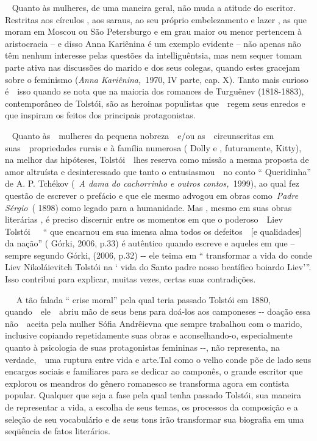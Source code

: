 ~ Quanto às mulheres, de uma maneira geral, não muda a atitude do
escritor. Restritas aos círculos , aos saraus, ao seu próprio
embelezamento e lazer , as que moram em Moscou ou São Petersburgo e em
grau maior ou menor pertencem à aristocracia -- e disso Anna Kariênina é
um exemplo evidente -- não apenas não têm nenhum interesse pelas
questões da intelliguêntsia, mas nem sequer tomam parte ativa nas
discussões do marido e dos seus colegas, quando estes gracejam sobre o
feminismo (\emph{Anna Kariênina,~}1970, IV parte, cap. X). Tanto mais
curioso é~~isso quando se nota que na maioria dos romances de Turguênev
(1818-1883), contemporâneo de Tolstói, são as heroinas populistas
que~~regem seus enredos e que inspiram os feitos dos principais
protagonistas.

~ Quanto às~~mulheres da pequena nobreza~~e/ou as~~circunscritas em
suas~~propriedades rurais e à família numerosa ( Dolly e , futuramente,
Kitty), na melhor das hipóteses, Tolstói~~lhes reserva como missão a
mesma proposta de amor altruísta e desinteressado que tanto o
entusiasmou~~no conto `` Queridinha'' de A. P. Tchékov (~\emph{A dama do
cachorrinho e outros contos,~}1999), ao qual fez questão de escrever o
prefácio e que ele mesmo advogou em obras como~\emph{Padre Sérgio}~(
1898) como legado para a humanidade. Mas , mesmo em suas obras
literárias , é preciso discernir entre os momentos em que o
poderoso~~Liev Tolstói~~~`` que encarnou em sua imensa alma todos os
defeitos~~{[}e qualidades{]} da nação'' ( Górki, 2006, p.33) é autêntico
quando escreve e aqueles em que -- sempre segundo Górki, (2006, p.32)
-\/- ele teima em `` transformar a vida do conde Liev Nikoláievitch
Tolstói na ` vida do Santo padre nosso beatífico boiardo Liev'''. Isso
contribui para explicar, muitas vezes, certas suas contradições.

~~ A tão falada `` crise moral'' pela qual teria passado Tolstói em
1880, quando~~ele~~abriu mão de seus bens para doá-los aos camponeses
-\/- doação essa não~~aceita pela mulher Sófia Andrêievna que sempre
trabalhou com o marido, inclusive copiando repetidamente suas obras e
aconselhando-o, especialmente quanto à psicologia de suas protagonistas
femininas -\/-, não representa, na verdade,~~uma ruptura entre vida e
arte.Tal como o velho conde põe de lado seus encargos sociais e
familiares para se dedicar ao camponês, o grande escritor que explorou
os meandros do gênero romanesco se transforma agora em contista popular.
Qualquer que seja a fase pela qual tenha passado Tolstói, sua maneira de
representar a vida, a escolha de seus temas, os processos da composição
e a seleção de seu vocabulário e de seus tons irão transformar sua
biografia em uma seqüência de fatos literários.

